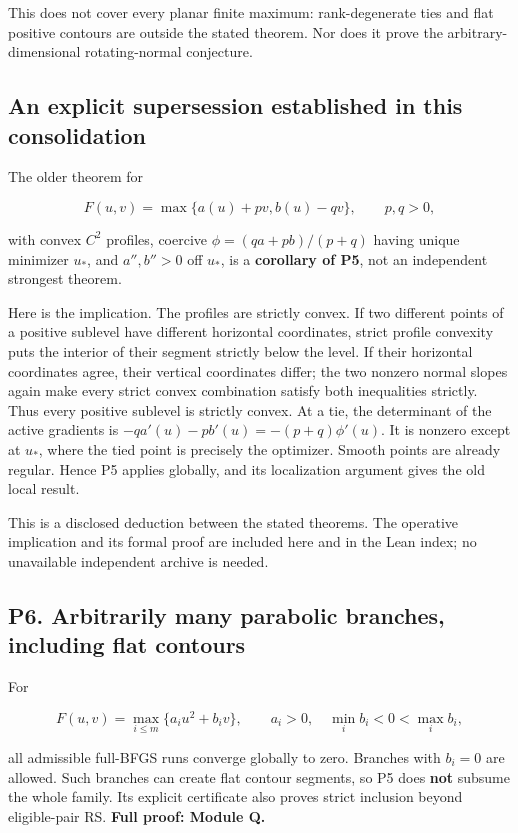 This does not cover every planar finite maximum: rank-degenerate ties and flat positive contours are outside the stated theorem. Nor does it prove the arbitrary-dimensional rotating-normal conjecture.

\subsection{An explicit supersession established in this consolidation}\label{an-explicit-supersession-established-in-this-consolidation}

The older theorem for

\[F(u,v)=\max\{a(u)+pv,b(u)-qv\},\qquad p,q>0,\]

with convex \(C^2\) profiles, coercive \(\phi=(qa+pb)/(p+q)\) having unique minimizer \(u_*\), and \(a'',b''>0\) off \(u_*\), is a \textbf{corollary of P5}, not an independent strongest theorem.

Here is the implication. The profiles are strictly convex. If two different points of a positive sublevel have different horizontal coordinates, strict profile convexity puts the interior of their segment strictly below the level. If their horizontal coordinates agree, their vertical coordinates differ; the two nonzero normal slopes again make every strict convex combination satisfy both inequalities strictly. Thus every positive sublevel is strictly convex. At a tie, the determinant of the active gradients is \(-qa'(u)-pb'(u)=-(p+q)\phi'(u)\). It is nonzero except at \(u_*\), where the tied point is precisely the optimizer. Smooth points are already regular. Hence P5 applies globally, and its localization argument gives the old local result.

This is a disclosed deduction between the stated theorems. The operative implication and its formal proof are included here and in the Lean index; no unavailable independent archive is needed.

\subsection{P6. Arbitrarily many parabolic branches, including flat contours}\label{p6.-arbitrarily-many-parabolic-branches-including-flat-contours}

For

\[F(u,v)=\max_{i\le m}\{a_i u^2+b_iv\},\qquad a_i>0,
\quad\min_i b_i<0<\max_i b_i,\]

all admissible full-BFGS runs converge globally to zero. Branches with \(b_i=0\) are allowed. Such branches can create flat contour segments, so P5 does \textbf{not} subsume the whole family. Its explicit certificate also proves strict inclusion beyond eligible-pair RS. \textbf{Full proof: Module Q.}

